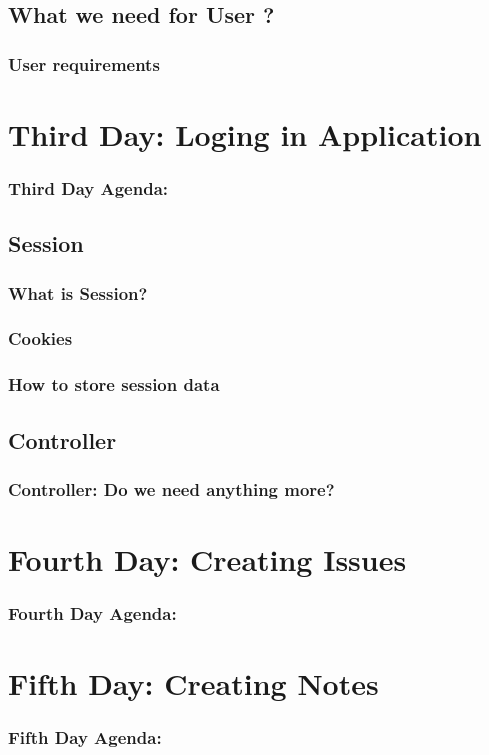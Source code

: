 \documentclass{beamer}
\theoremstyle{mystyle}
\begin{document}
  \subsection{What we need for User ?}
    \begin{frame}
      \frametitle{User requirements}
    \end{frame}

\section{Third Day: Loging in Application}
    \begin{frame}
      \frametitle{Third Day Agenda:}
      \tableofcontents
      [
      currentsection,
      sectionstyle=hide/hide,
      subsectionstyle=show/show/hide
      ]
    \end{frame}
  \subsection{Session}
    \begin{frame}
      \frametitle{What is Session?}
    \end{frame}
    \subsubsection{Cookies}
      \begin{frame}
        \frametitle{How to store session data}
      \end{frame}
      \subsection{Controller}
      \begin{frame}
        \frametitle{Controller: Do we need anything more?}
      \end{frame}
 

\section{Fourth Day: Creating Issues}
    \begin{frame}
      \frametitle{Fourth Day Agenda:}
      \tableofcontents
      [
      currentsection,
      sectionstyle=hide/hide,
      subsectionstyle=show/show/hide
      ]
    \end{frame}

\section{Fifth Day: Creating Notes}
    \begin{frame}
      \frametitle{Fifth Day Agenda:}
      \tableofcontents
      [
      currentsection,
      sectionstyle=hide/hide,
      subsectionstyle=show/show/hide
      ]
    \end{frame}
  
\end{document}
